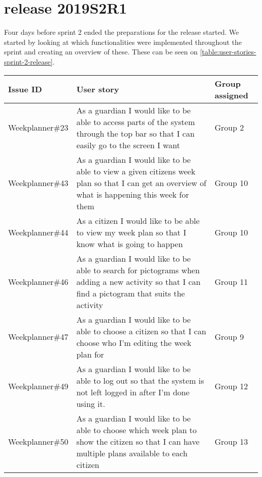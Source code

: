 \section{release 2019S2R1}
Four days before sprint 2 ended the preparations for the release started.
We started by looking at which functionalities were implemented throughout the sprint and creating an overview of these.
These can be seen on \autoref{table:user-stories-sprint-2-release}.

\begin{table}[H]
    \small
    \begin{tabular}{|p{2.8cm}|p{7cm}|p{2cm}|}
    \hline
    Issue ID        & User story                                                                                                                                                                               & Group assigned      \\ \hline
    Weekplanner\#23 & As a guardian I would like to be able to access parts of the system through the top bar so that I can easily go to the screen I want                                                     & Group 2             \\ \hline
    Weekplanner\#43 & As a guardian I would like to be able to view a given citizens week plan so that I can get an overview of what is happening this week for them                                           & Group 10            \\ \hline
    Weekplanner\#44 & As a citizen I would like to be able to view my week plan so that I know what is going to happen                                                                                         & Group 10            \\ \hline
    Weekplanner\#46 & As a guardian I would like to be able to search for pictograms when adding a new activity so that I can find a pictogram that suits the activity                                         & Group 11            \\ \hline
    Weekplanner\#47 & As a guardian I would like to be able to choose a citizen so that I can choose who I’m editing the week plan for                                                                         & Group 9             \\ \hline
    Weekplanner\#49 & As a guardian I would like to be able to log out so that the system is not left logged in after I’m done using it.                                                                       & Group 12            \\ \hline
    Weekplanner\#50 & As a guardian I would like to be able to choose which week plan to show the citizen so that I can have multiple plans available to each citizen                                          & Group 13            \\ \hline


\end{tabular}
\end{table}
